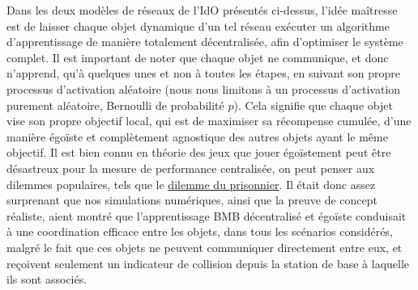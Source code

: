 \begin{resume_fr}
%
Dans les deux modèles de réseaux de l'IdO présentés ci-dessus, l'idée maîtresse est de laisser chaque objet dynamique d'un tel réseau exécuter un algorithme d'apprentissage de manière totalement décentralisée, afin d'optimiser le système complet.
Il est important de noter que chaque objet ne communique, et donc n'apprend, qu'à quelques unes et non à toutes les étapes, en suivant son propre processus d'activation aléatoire (nous nous limitons à un processus d'activation purement aléatoire, Bernoulli de probabilité $p$).
Cela signifie que chaque objet vise son propre objectif local, qui est de maximiser sa récompense cumulée, d'une manière égoïste et complètement agnostique des autres objets ayant le même objectif.
Il est bien connu en théorie des jeux que jouer égoïstement peut être désastreux pour la mesure de performance centralisée, on peut penser aux \guillemotleft{} dilemmes \guillemotright{} populaires, tels que le \href{https://fr.wikipedia.org/wiki/Dilemme_du_prisonnier}{dilemme du prisonnier}.
Il était donc assez surprenant que nos simulations numériques, ainsi que la preuve de concept réaliste, aient montré que l'apprentissage BMB décentralisé et égoïste conduisait à une coordination efficace entre les objets, dans tous les scénarios considérés, malgré le fait que ces objets ne peuvent communiquer directement entre eux, et reçoivent seulement un indicateur de collision depuis la station de base à laquelle ils sont associés.


\end{resume_fr}
